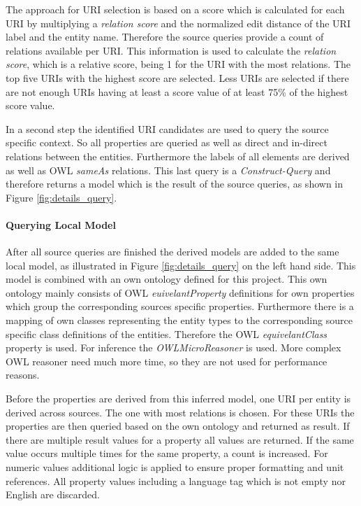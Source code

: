 \documentclass[11pt,titlepage,oneside,openany]{article}
\begin{document}
The approach for URI selection is based on a score which is calculated for each URI by multiplying a \textit{relation score} and the normalized edit distance of the URI label and the entity name. Therefore the source queries provide a count of relations available per URI. This information is used to calculate the \textit{relation score}, which is a relative score, being 1 for the URI with the most relations. The top five URIs with the highest score are selected. Less URIs are selected if there are not enough URIs having at least a score value of at least 75\% of the highest score value.

In a second step the identified URI candidates are used to query the source specific context. So all properties are queried as well as direct and in-direct relations between the entities. Furthermore the labels of all elements are derived as well as OWL \textit{sameAs} relations. 
This last query is a \textit{Construct-Query} and therefore returns a model which is the result of the source queries, as shown in Figure \ref{fig:details_query}. 

\paragraph{Querying Local Model}
After all source queries are finished the derived models are added to the same local model, as illustrated in Figure \ref{fig:details_query} on the left hand side. This model is combined with an own ontology defined for this project. This own ontology mainly consists of OWL \textit{euivelantProperty} definitions for own properties which group the corresponding sources specific properties. Furthermore there is a mapping of own classes representing the entity types to the corresponding source specific class definitions of the entities. Therefore the OWL \textit{equivelantClass} property is used. For inference the \textit{OWLMicroReasoner} is used. More complex OWL reasoner need much more time, so they are not used for performance reasons. 

Before the properties are derived from this inferred model, one URI per entity is derived across sources. The one with most relations is chosen. 
For these URIs the properties are then queried based on the own ontology and returned as result. If there are multiple result values for a property all values are returned. If the same value occurs multiple times for the same property, a count is increased. For numeric values additional logic is applied to ensure proper formatting and unit references. All property values including a language tag which is not empty nor English are discarded.
\end{document}

